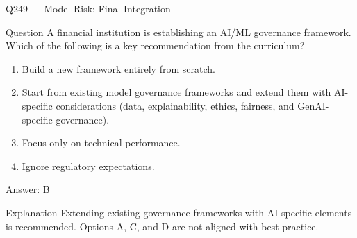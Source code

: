\documentclass[aspectratio=169,8pt]{beamer}
\begin{document}
																																																								\begin{frame}{Q249 --- Model Risk: Final Integration}
																																																									\begin{block}{Question}
																																																										A financial institution is establishing an AI/ML governance framework. Which of the following is a key recommendation from the curriculum?
																																																										\begin{enumerate}
																																																											\item Build a new framework entirely from scratch.
																																																											\item Start from existing model governance frameworks and extend them with AI-specific considerations (data, explainability, ethics, fairness, and GenAI-specific governance).
																																																											\item Focus only on technical performance.
																																																											\item Ignore regulatory expectations.
																																																										\end{enumerate}  \end{block}
																																																										\begin{exampleblock}{Answer: B}\end{exampleblock}
																																																										\begin{block}{Explanation}
																																																											Extending existing governance frameworks with AI-specific elements is recommended. Options A, C, and D are not aligned with best practice.
																																																										\end{block}
																																																									\end{frame}
																																																									
\end{document}
